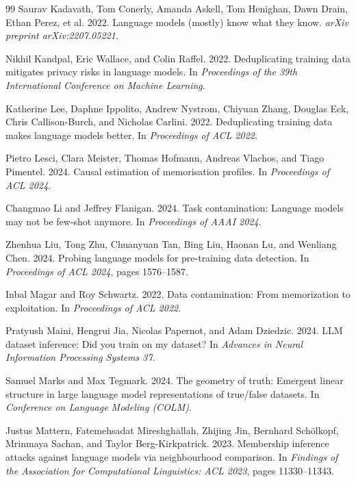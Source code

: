 \documentclass[10pt,twocolumn,letterpaper]{article}
\begin{document}
\begin{thebibliography}{99}
Saurav Kadavath, Tom Conerly, Amanda Askell, Tom Henighan, Dawn Drain, Ethan Perez, et al. 2022.
Language models (mostly) know what they know.
\emph{arXiv preprint arXiv:2207.05221}.

Nikhil Kandpal, Eric Wallace, and Colin Raffel. 2022.
Deduplicating training data mitigates privacy risks in language models.
In \emph{Proceedings of the 39th International Conference on Machine Learning}.

Katherine Lee, Daphne Ippolito, Andrew Nystrom, Chiyuan Zhang, Douglas Eck, Chris Callison-Burch, and Nicholas Carlini. 2022.
Deduplicating training data makes language models better.
In \emph{Proceedings of ACL 2022}.

Pietro Lesci, Clara Meister, Thomas Hofmann, Andreas Vlachos, and Tiago Pimentel. 2024.
Causal estimation of memorisation profiles.
In \emph{Proceedings of ACL 2024}.

Changmao Li and Jeffrey Flanigan. 2024.
Task contamination: Language models may not be few-shot anymore.
In \emph{Proceedings of AAAI 2024}.

Zhenhua Liu, Tong Zhu, Chuanyuan Tan, Bing Liu, Haonan Lu, and Wenliang Chen. 2024.
Probing language models for pre-training data detection.
In \emph{Proceedings of ACL 2024}, pages 1576--1587.

Inbal Magar and Roy Schwartz. 2022.
Data contamination: From memorization to exploitation.
In \emph{Proceedings of ACL 2022}.

Pratyush Maini, Hengrui Jia, Nicolas Papernot, and Adam Dziedzic. 2024.
LLM dataset inference: Did you train on my dataset?
In \emph{Advances in Neural Information Processing Systems 37}.

Samuel Marks and Max Tegmark. 2024.
The geometry of truth: Emergent linear structure in large language model representations of true/false datasets.
In \emph{Conference on Language Modeling (COLM)}.

Justus Mattern, Fatemehsadat Mireshghallah, Zhijing Jin, Bernhard Sch\"olkopf, Mrinmaya Sachan, and Taylor Berg-Kirkpatrick. 2023.
Membership inference attacks against language models via neighbourhood comparison.
In \emph{Findings of the Association for Computational Linguistics: ACL 2023}, pages 11330--11343.


\end{thebibliography}
\end{document}
